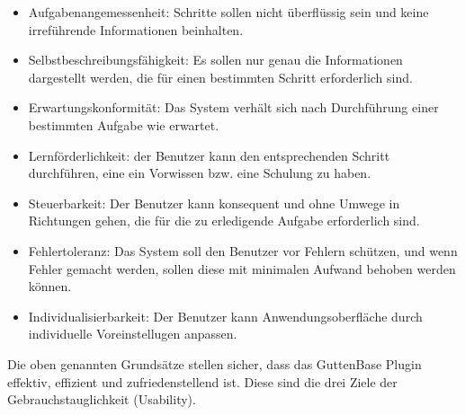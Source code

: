 \begin{itemize}
	\item Aufgabenangemessenheit:
	Schritte sollen nicht überflüssig sein und keine irreführende Informationen beinhalten.
	
	\item Selbstbeschreibungsfähigkeit:
	Es sollen nur genau die Informationen dargestellt werden, die für einen bestimmten Schritt erforderlich sind.
	
	\item Erwartungskonformität:
	Das System verhält sich nach Durchführung einer bestimmten Aufgabe wie erwartet.
	
	\item Lernförderlichkeit:
	der Benutzer kann den entsprechenden Schritt durchführen, eine ein Vorwissen bzw. eine Schulung zu haben.
	
	\item Steuerbarkeit:
	Der Benutzer kann konsequent und ohne Umwege in Richtungen gehen, die für die zu erledigende Aufgabe erforderlich sind.
	
	\item Fehlertoleranz:
	Das System soll den Benutzer vor Fehlern schützen, und wenn Fehler gemacht werden, sollen diese mit minimalen Aufwand behoben werden können.

	\item Individualisierbarkeit:
	Der Benutzer kann Anwendungsoberfläche durch individuelle Voreinstellugen anpassen.
	
\end{itemize}
Die oben genannten Grundsätze stellen sicher, dass das GuttenBase Plugin effektiv, effizient und zufriedenstellend ist. Diese sind die drei Ziele der Gebrauchstauglichkeit (Usability). \\

